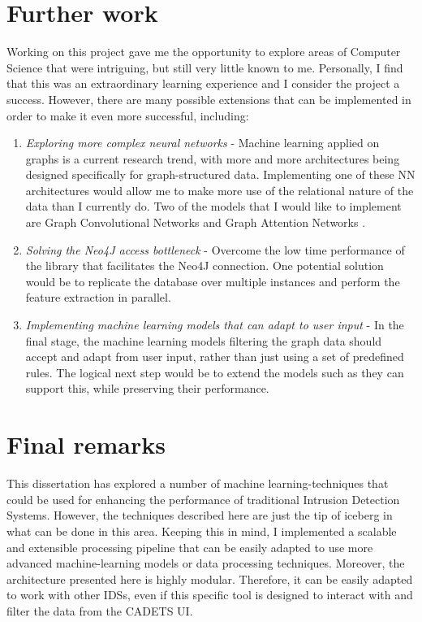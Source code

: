 	\section{Further work}
		Working on this project gave me the opportunity to explore areas of Computer Science that were intriguing, but still very little known to me. Personally, I find that this was an extraordinary learning experience and I consider the project a success. However, there are many possible extensions that can be implemented in order to make it even more successful, including:
		\begin{enumerate}
			\item \textit{Exploring more complex neural networks} - Machine learning applied on graphs is a current research trend, with more and more architectures being designed specifically for graph-structured data. Implementing one of these NN architectures would allow me to make more use of the relational nature of the data than I currently do. Two of the models that I would like to implement are Graph Convolutional Networks \cite{kipf2017semi} and Graph Attention Networks \cite{2017arXiv171010903V}.
			
			\item \textit{Solving the Neo4J access bottleneck} - Overcome the low time performance of the library that facilitates the Neo4J connection. One potential solution would be to replicate the database over multiple instances and perform the feature extraction in parallel. 
				
			\item \textit{Implementing machine learning models that can adapt to user input} - In the final stage, the machine learning models filtering the graph data should accept and adapt from user input, rather than just using a set of predefined rules. The logical next step would be to extend the models such as they can support this, while preserving their performance.
	\end{enumerate}
	
	\section*{Final remarks}
	This dissertation has explored a number of machine learning-techniques that could be used for enhancing the performance of traditional Intrusion Detection Systems. However, the techniques described here are just the tip of iceberg in what can be done in this area. Keeping this in mind, I implemented a scalable and extensible processing pipeline that can be easily adapted to use more advanced machine-learning models or data processing techniques. Moreover, the architecture presented here is highly modular. Therefore, it can be easily adapted to work with other IDSs, even if this specific tool is designed to interact with and filter the data from the CADETS UI.
